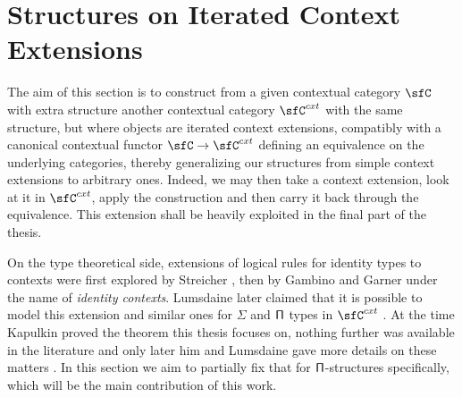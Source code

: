 \chapter{Structures on Iterated Context Extensions}

The aim of this section is to construct from a given contextual category $\sfC$
with extra structure another contextual category $\sfC^{cxt}$ with the same
structure, but where objects are iterated context extensions, compatibly with a
canonical contextual functor $\sfC\rightarrow\sfC^{cxt}$ defining an equivalence
on the underlying categories, thereby
generalizing our structures from simple context extensions to arbitrary ones.
Indeed, we may then take a context extension, look at it in $\sfC^{cxt}$, apply
the construction and then carry it back through the equivalence. This extension
shall be heavily exploited in the final part of the thesis.

On the type theoretical side, extensions of logical rules for identity types to
contexts were first explored by Streicher \cite{Str93}, then by Gambino and
Garner \cite{GG08} under the name of \emph{identity contexts}. Lumsdaine later
claimed that it is possible to model this extension and similar ones for
$\Sigma$ and $\operatorname{\mathsf{\Pi}}$ types in $\sfC^{cxt}$ \cite[26]{Lum10}. At the time
Kapulkin proved the theorem this thesis focuses on,
nothing further was available in the literature and only later him and
Lumsdaine gave more details on these matters \cite{KL18}. In this section we aim
to partially fix that for $\operatorname{\mathsf{\Pi}}$-structures specifically, which will be the main
contribution of this work.


